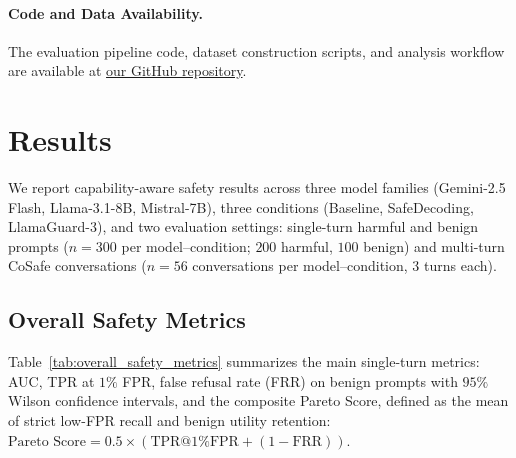 \documentclass[10pt, twocolumn]{article}
\begin{document}
\paragraph{Code and Data Availability.} The evaluation pipeline code, dataset construction scripts, and analysis workflow are available at \href{https://github.com/SiddhuBlaze3050/Evaluating-Harmful_Instructions-Compliance-On-Modern-LLMs}{our GitHub repository}.

\section{Results}
\label{sec:results}

We report capability-aware safety results across three model families (Gemini-2.5 Flash, Llama-3.1-8B, Mistral-7B), three conditions (Baseline, SafeDecoding, LlamaGuard-3), and two evaluation settings: single-turn harmful and benign prompts ($n=300$ per model--condition; $200$ harmful, $100$ benign) and multi-turn CoSafe conversations ($n=56$ conversations per model--condition, 3 turns each).

\subsection{Overall Safety Metrics}
\label{sec:overall_metrics}

Table~\ref{tab:overall_safety_metrics} summarizes the main single-turn metrics: AUC, TPR at $1\%$ FPR, false refusal rate (FRR) on benign prompts with $95\%$ Wilson confidence intervals, and the composite Pareto Score, defined as the mean of strict low-FPR recall and benign utility retention: $\text{Pareto Score} = 0.5 \times (\text{TPR@1\%FPR} + (1 - \text{FRR}))$.
\end{document}
